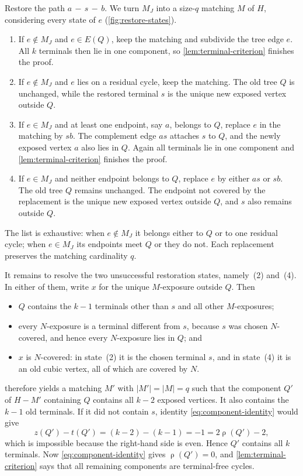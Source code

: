 \documentclass[a4paper,11pt]{article}
\newcommand{\abs}[1]{\left\lvert#1\right\rvert}
\DeclareMathOperator{\cyc}{\rho}               %
\numberwithin{equation}{section}
\begin{document}
Restore the path $a\,{-}\,s\,{-}\,b$. We turn $M_J$ into a size-$q$ matching $M$
of $H$, considering every state of $e$ (\cref{fig:restore-states}).
\begin{enumerate}
  \item If $e\notin M_J$ and $e\in E(Q)$, keep the matching and subdivide the
    tree edge $e$. All $k$ terminals then lie in one component, so
    \cref{lem:terminal-criterion} finishes the proof.
  \item If $e\notin M_J$ and $e$ lies on a residual cycle, keep the matching.
    The old tree $Q$ is unchanged, while the restored terminal $s$ is the unique
    new exposed vertex outside $Q$.
  \item If $e\in M_J$ and at least one endpoint, say $a$, belongs to $Q$,
    replace $e$ in the matching by $sb$. The complement edge $as$ attaches $s$
    to $Q$, and the newly exposed vertex $a$ also lies in $Q$. Again all
    terminals lie in one component and \cref{lem:terminal-criterion} finishes the proof.
  \item If $e\in M_J$ and neither endpoint belongs to $Q$, replace $e$ by either
    $as$ or $sb$. The old tree $Q$ remains unchanged. The endpoint not covered
    by the replacement is the unique new exposed vertex outside $Q$, and $s$
    also remains outside $Q$.
\end{enumerate}
The list is exhaustive: when $e\notin M_J$ it belongs either to $Q$ or to one
residual cycle; when $e\in M_J$ its endpoints meet $Q$ or they do not. Each
replacement preserves the matching cardinality $q$.

It remains to resolve the two unsuccessful restoration states, namely~(2)
and~(4). In either of them, write $x$ for the unique $M$-exposure outside $Q$.
Then
\begin{itemize}
  \item $Q$ contains the $k-1$ terminals other than $s$ and all other
    $M$-exposures;
  \item every $N$-exposure is a terminal different from $s$, because $s$ was
    chosen $N$-covered, and hence every $N$-exposure lies in $Q$; and
  \item $x$ is $N$-covered: in state~(2) it is the chosen terminal $s$, and in
    state~(4) it is an old cubic vertex, all of which are covered by $N$.
\end{itemize}
 therefore yields a
matching $M'$ with $\abs{M'}=\abs{M}=q$ such that the component $Q'$ of $H-M'$
containing $Q$ contains all $k-2$ exposed vertices. It also contains the $k-1$
old terminals. If it did not contain $s$, identity
\cref{eq:component-identity} would give
\[
  z(Q')-t(Q')=(k-2)-(k-1)=-1=2\cyc(Q')-2 ,
\]
which is impossible because the right-hand side is even. Hence $Q'$ contains all
$k$ terminals. Now \cref{eq:component-identity} gives $\cyc(Q')=0$, and
\cref{lem:terminal-criterion} says that all remaining components are
terminal-free cycles.
\end{document}
